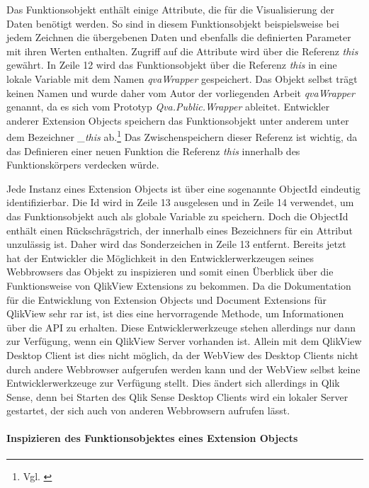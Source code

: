 Das Funktionsobjekt enthält einige Attribute, die für die Visualisierung der Daten benötigt werden. So sind in diesem Funktionsobjekt beispielsweise bei jedem Zeichnen die übergebenen Daten und ebenfalls die definierten Parameter mit ihren Werten enthalten. Zugriff auf die Attribute wird über die Referenz \textit{this} gewährt. In Zeile 12 wird das Funktionsobjekt über die Referenz \textit{this} in eine lokale Variable mit dem Namen \textit{qvaWrapper} gespeichert. Das Objekt selbst trägt keinen Namen und wurde daher vom Autor der vorliegenden Arbeit \textit{qvaWrapper} genannt, da es sich vom Prototyp \textit{Qva.Public.Wrapper} ableitet. Entwickler anderer Extension Objects speichern das Funktionsobjekt unter anderem unter dem Bezeichner \textit{\_this} ab.\footnote{Vgl. \cite{qvD3BulletChartsScriptJs}} Das Zwischenspeichern dieser Referenz ist wichtig, da das Definieren einer neuen Funktion die Referenz \textsl{this} innerhalb des Funktionskörpers verdecken würde.


Jede Instanz eines Extension Objects ist über eine sogenannte ObjectId eindeutig identifizierbar. Die Id wird in Zeile 13 ausgelesen und in Zeile 14 verwendet, um das Funktionsobjekt auch als globale Variable zu speichern. Doch die ObjectId enthält einen Rückschrägstrich, der innerhalb eines Bezeichners für ein Attribut unzulässig ist. Daher wird das Sonderzeichen in Zeile 13 entfernt. Bereits jetzt hat der Entwickler die Möglich\-keit in den Entwickler\-werkzeugen seines Webbrowsers das Objekt zu inspizieren und somit einen Überblick über die Funktionsweise von QlikView Extensions zu bekommen. Da die Dokumentation für die Entwicklung von Extension Objects und Document Extensions für QlikView sehr rar ist, ist dies eine hervorragende Methode, um Informationen über die API zu erhalten. Diese Entwickler\-werkzeuge stehen allerdings nur dann zur Verfügung, wenn ein QlikView Server vorhanden ist. Allein mit dem QlikView Desktop Client ist dies nicht möglich, da der WebView des Desktop Clients nicht durch andere Webbrowser aufgerufen werden kann und der WebView selbst keine Entwickler\-werkzeuge zur Verfügung stellt. Dies ändert sich allerdings in Qlik Sense, denn bei Starten des Qlik Sense Desktop Clients wird ein lokaler Server gestartet, der sich auch von anderen Webbrowsern aufrufen lässt.


\paragraph{Inspizieren des Funktionsobjektes eines Extension Objects}



